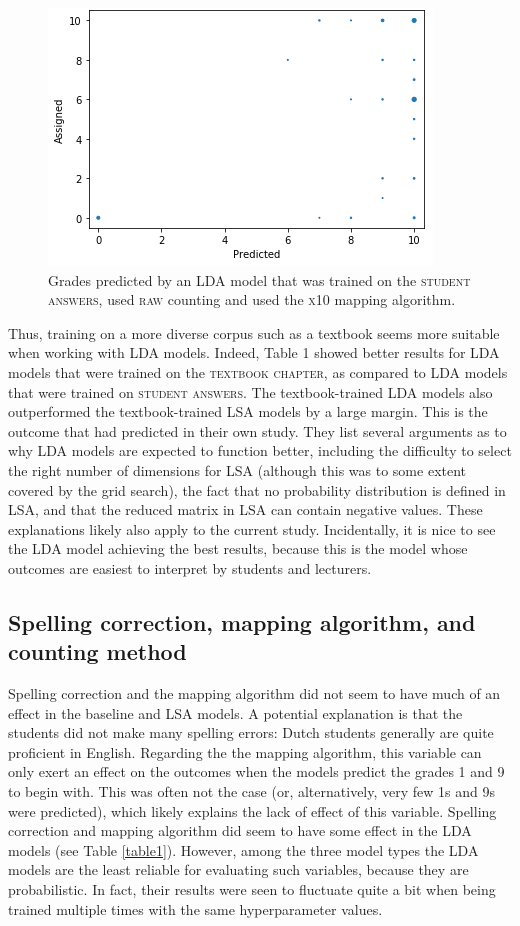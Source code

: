 \documentclass[a4paper,10pt,twoside]{article}
\begin{document}
\begin{figure}[h]
	\centering
	\includegraphics[width=0.5\linewidth]{"LDA predicts tens"}
	\caption{Grades predicted by an LDA model that was trained on the \textsc{student answers}, used \textsc{raw} counting and used the \textsc{x10} mapping algorithm.}
	\label{lda-predicts-tens}
\end{figure}

Thus, training on a more diverse corpus such as a textbook seems more suitable when working with LDA models. Indeed, Table 1 showed better results for LDA models that were trained on the \textsc{textbook chapter}, as compared to LDA models that were trained on \textsc{student answers}. The textbook-trained LDA models also outperformed the textbook-trained LSA models by a large margin. This is the outcome that  had predicted in their own study. They list several arguments as to why LDA models are expected to function better, including the difficulty to select the right number of dimensions for LSA (although this was to some extent covered by the grid search), the fact that no probability distribution is defined in LSA, and that the reduced matrix in LSA can contain negative values. These explanations likely also apply to the current study. Incidentally, it is nice to see the LDA model achieving the best results, because this is the model whose outcomes are easiest to interpret by students and lecturers.

\subsection{Spelling correction, mapping algorithm, and counting method}
Spelling correction and the mapping algorithm did not seem to have much of an effect in the baseline and LSA models. A potential explanation is that the students did not make many spelling errors: Dutch students generally are quite proficient in English. Regarding the the mapping algorithm, this variable can only exert an effect on the outcomes when the models predict the grades 1 and 9 to begin with. This was often not the case (or, alternatively, very few 1s and 9s were predicted), which likely explains the lack of effect of this variable. Spelling correction and mapping algorithm did seem to have some effect in the LDA models (see Table \ref{table1}). However, among the three model types the LDA models are the least reliable for evaluating such variables, because they are probabilistic. In fact, their results were seen to fluctuate quite a bit when being trained multiple times with the same hyperparameter values.
\end{document}
